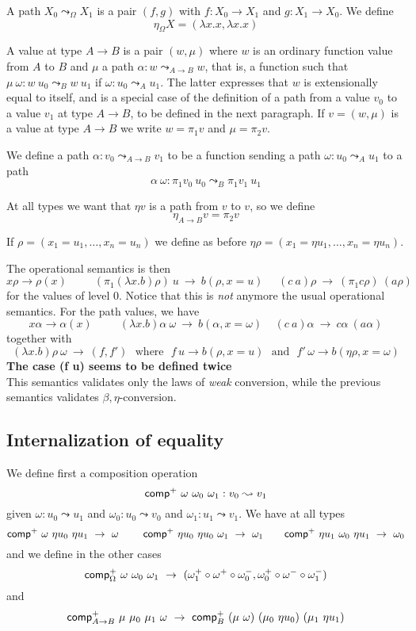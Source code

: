 \documentclass[10pt,a4paper]{article}
\newcommand{\comp}{{\sf comp}}
\begin{document}
 A path $X_0\leadsto_{\Omega} X_1$ is a pair $(f,g)$ with $f:X_0\rightarrow X_1$ and
$g:X_1\rightarrow X_0$. We define
$$
\eta_{\Omega} X = (\lambda x.x,\lambda x.x)
$$

 A value at type $A\rightarrow B$ is a pair $(w,\mu)$ where $w$ is an ordinary function value
from $A$ to $B$ and $\mu$ a path $\alpha:w\leadsto _{A\rightarrow B} w$, that is, a function such 
that $\mu~\omega:w~u_0\leadsto_{B} w~u_1$ if $\omega:u_0\leadsto_{A} u_1$. 
The latter expresses that $w$ is extensionally equal to itself, 
and is a special case of the definition of
a path from a value $v_0$ to a value $v_1$ at type $A\rightarrow B$, to be defined
in the next paragraph. If $v=(w,\mu)$ is a value at type $A\rightarrow B$ we write 
$w = \pi_1 v$ and $\mu = \pi_2 v$.

 We define a path $\alpha:v_0\leadsto _{A\rightarrow B} v_1$ to be a function 
sending a path $\omega:u_0\leadsto _A u_1$ to a path
$$
\alpha~\omega:\pi_1 v_0~u_0\leadsto_B \pi_1 v_1~u_1
$$

 At all types we want that $\eta v$ is a path from $v$ to $v$, so we define 
$$
\eta_{A\rightarrow B} v = \pi_2 v
$$

 If $\rho = (x_1=u_1,\dots,x_n=u_n)$ we define as before $\eta\rho = (x_1 = \eta u_1,\dots, x_n = \eta u_n)$.

\medskip
 
 The operational semantics is then
$$
x\rho\rightarrow \rho(x)~~~~~~~~~~~
(\pi_1 (\lambda x.b)\rho)~u ~\rightarrow~ b(\rho,x=u)~~~~~~(c~a)\rho ~\rightarrow~ (\pi_1 c\rho)~(a\rho)~~~~~~~
$$
for the values of level $0$. Notice that this is {\em not} anymore the usual operational semantics.
For the path values, we have
$$
x\alpha\rightarrow \alpha(x)~~~~~~~~~~~
(\lambda x.b)\alpha~\omega ~\rightarrow~ b(\alpha,x=\omega)~~~~~(c~a)\alpha ~\rightarrow~ c\alpha~(a\alpha)
$$
together with
$$
(\lambda x.b)\rho~\omega ~\rightarrow~ (f,f')
~~~\mbox{where}~~~f\,u \to b(\rho,x = u)
~~~\mbox{and}~~~f'\,\omega \to b(\eta\rho,x = \omega)
$$
{\bf The case (f u) seems to be defined twice}\\
 This semantics validates only the laws of {\em weak} conversion, while the previous semantics validates
$\beta,\eta$-conversion.



\subsection{Internalization of equality}

 We define first a composition operation
$$
\comp^+~\omega~\omega_0~\omega_1 : v_0\leadsto v_1
$$
given $\omega:u_0\leadsto u_1$ and $\omega_0:u_0\leadsto v_0$ and $\omega_1:u_1\leadsto v_1$.
We have at all types
$$
\comp^+~\omega~\eta u_0~\eta u_1 ~\rightarrow~ \omega~~~~~~~
\comp^+~\eta u_0~\eta u_0~\omega_1 ~\rightarrow~ \omega_1~~~~~~
\comp^+~\eta u_1~\omega_0~\eta u_1 ~\rightarrow~ \omega_0
$$
and we define in the other cases
$$
\comp^+_{\Omega}~\omega~\omega_0~\omega_1  ~\rightarrow~  
(\omega_1^+ \circ  \omega^+ \circ \omega_0^-,\omega_0^+ \circ  \omega^- \circ \omega_1^-)
$$
and
$$
\comp^+_{A\rightarrow B}~\mu~\mu_0~\mu_1~\omega ~\rightarrow~\comp^+_B~(\mu~\omega)~(\mu_0~\eta u_0)~(\mu_1~\eta u_1)
$$
\end{document}
